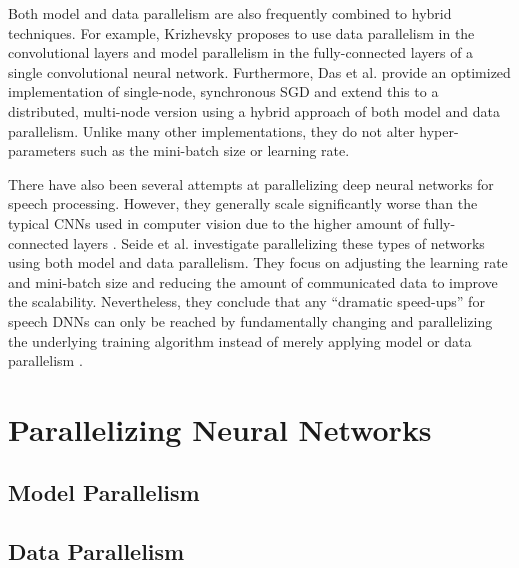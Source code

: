\documentclass[conference,compsoc,a4paper]{IEEEtran}
\begin{document}
Both model and data parallelism are also frequently combined to hybrid techniques.
For example, Krizhevsky \cite{krizhevsky2014-One-weird-trick} proposes to use data parallelism in the convolutional layers and model parallelism in the fully-connected layers of a single convolutional neural network.
%
Furthermore, Das et al. \cite{das2016-Distributed-deep-learning} provide an optimized implementation of single-node, synchronous SGD and extend this to a distributed, multi-node version using a hybrid approach of both model and data parallelism.
Unlike many other implementations, they do not alter hyper-parameters such as the mini-batch size or learning rate.

There have also been several attempts at parallelizing deep neural networks for speech processing.
However, they generally scale significantly worse than the typical CNNs used in computer vision due to the higher amount of fully-connected layers \cite{dean2012-Large-scale-distributed,seide2014-Speech-DNNs}.
Seide et al. \cite{seide2014-Speech-DNNs,seide2014-1-bit-stochastic} investigate parallelizing these types of networks using both model and data parallelism.
They focus on adjusting the learning rate and mini-batch size \cite{seide2014-Speech-DNNs} and reducing the amount of communicated data \cite{seide2014-1-bit-stochastic} to improve the scalability.
Nevertheless, they conclude that any ``dramatic speed-ups'' for speech DNNs can only be reached by fundamentally changing and parallelizing the underlying training algorithm instead of merely applying model or data parallelism \cite{seide2014-Speech-DNNs,seide2014-1-bit-stochastic}.


\section{Parallelizing Neural Networks} %
\label{sec:parallelizing_neural_networks}

\subsection{Model Parallelism} %
\label{sub:model_parallelism}


\subsection{Data Parallelism} %
\label{sub:data_parallelism}
\end{document}
